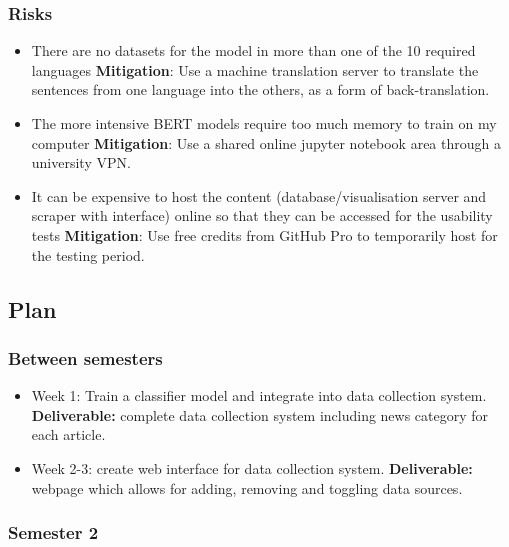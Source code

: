 \documentclass[11pt]{article}
\begin{document}
\subsubsection{Risks}\label{risks}

\begin{itemize}
\tightlist
\item There are no datasets for the model in more than one of the 10 required languages \textbf{Mitigation}: Use a machine translation server to translate the sentences from one language into the others, as a form of back-translation.
\item  The more intensive BERT models require too much memory to train on my computer \textbf{Mitigation}: Use a shared online jupyter notebook area through a university VPN.
\item It can be expensive to host the content (database/visualisation server and scraper with interface) online so that they can be accessed for the usability tests \textbf{Mitigation}: Use free credits from GitHub Pro to temporarily host for the testing period.
\end{itemize}

\subsection{Plan}\label{plan}

\subsubsection{Between semesters}

\begin{itemize}
    \tightlist
    \item
      Week 1: Train a classifier model and integrate into data collection system. \textbf{Deliverable:}
      complete data collection system including news category for each article.
    \item
      Week 2-3: create web interface for data collection system.
      \textbf{Deliverable:} webpage which allows for adding, removing and toggling data sources.
    \end{itemize}

\subsubsection{Semester 2}
\end{document}
